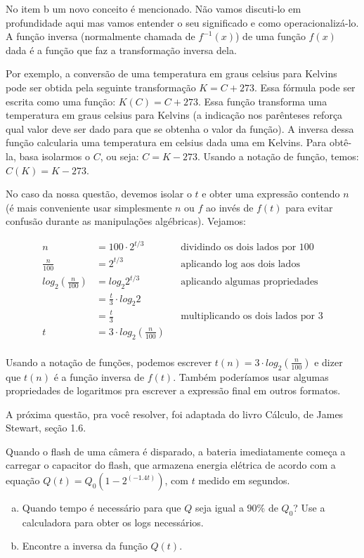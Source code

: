 \documentclass[main_estudante.tex]{subfiles}
\begin{document}
No item b um novo conceito é mencionado. Não vamos discuti-lo em profundidade aqui mas vamos entender o seu significado e como operacionalizá-lo. A função inversa (normalmente chamada de $f^{-1}(x)$) de uma função $f(x)$ dada é a função que faz a transformação inversa dela.

Por exemplo, a conversão de uma temperatura em graus celsius para Kelvins pode ser obtida pela seguinte transformação $K=C+273$. Essa fórmula pode ser escrita como uma função: $K(C)=C+273$. Essa função transforma uma temperatura em graus celsius para Kelvins (a indicação nos parênteses reforça qual valor deve ser dado para que se obtenha o valor da função). A inversa dessa função calcularia uma temperatura em celsius dada uma em Kelvins. Para obtê-la, basa isolarmos o $C$, ou seja: $C=K-273$. Usando a notação de função, temos: $C(K)=K-273$.

No caso da nossa questão, devemos isolar o $t$ e obter uma expressão contendo $n$ (é mais conveniente usar simplesmente $n$ ou $f$ ao invés de $f(t)$ para evitar confusão durante as manipulações algébricas). Vejamos:

\begin{align*}
n & {} = 100 \cdot 2^{t/3} && \text{dividindo os dois lados por 100}\\
\frac{n}{100} & {} = 2^{t/3} && \text{aplicando log aos dois lados} \\
log_2 (\frac{n}{100}) & {} = log_2 2^{t/3} && \text{aplicando algumas propriedades} \\
 & {} = \frac{t}{3} \cdot log_2 2 \\
 & {} = \frac{t}{3} && \text{multiplicando os dois lados por 3}\\
t & {} = 3 \cdot log_2 (\frac{n}{100}) \\
\end{align*}

Usando a notação de funções, podemos escrever $t(n) = 3 \cdot log_2 (\frac{n}{100})$ e dizer que $t(n)$ é a função inversa de $f(t)$. Também poderíamos usar algumas propriedades de logaritmos pra escrever a expressão final em outros formatos.

A próxima questão, pra você resolver, foi adaptada do livro Cálculo, de James Stewart, seção 1.6.

\begin{resolva}
Quando o flash de uma câmera é disparado, a bateria imediatamente começa a carregar o capacitor do flash, que armazena energia elétrica de acordo com a equação $Q(t)=Q_0(1-2^(-1.4t))$, com $t$ medido em segundos.
\begin{enumerate}[a)]
 \item Quando tempo é necessário para que $Q$ seja igual a $90\%$ de $Q_0$? Use a calculadora para obter os logs necessários.
 \item Encontre a inversa da função $Q(t)$.
\end{enumerate}
\end{resolva}
\end{document}
